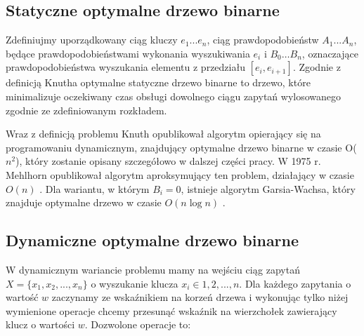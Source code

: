 \documentclass[declaration,shortabstract]{iithesis}
\theoremstyle{thm}
\theoremstyle{remark}
\theoremstyle{plain}
\theoremstyle{plain}
\theoremstyle{plain}
\begin{document}
\subsection{Statyczne optymalne drzewo binarne}   

Zdefiniujmy uporządkowany ciąg kluczy \(e_1...e_n\), ciąg prawdopodobieństw \(A_1...A_n\), będące prawdopodobieństwami wykonania wyszukiwania \(e_i\) i  \(B_0 … B_n\), oznaczające prawdopodobieństwa wyszukania elementu z przedziału \([e_i, e_{i+1}]\). Zgodnie z definicją Knutha \cite{knuth1971optimum} optymalne statyczne drzewo binarne to drzewo, które minimalizuje oczekiwany czas obsługi dowolnego ciągu zapytań wylosowanego zgodnie ze zdefiniowanym rozkładem.    

Wraz z definicją problemu Knuth opublikował algorytm opierający się na programowaniu dynamicznym, znajdujący optymalne drzewo binarne w czasie O(\(n^2\)), który zostanie opisany szczegółowo w dalszej części pracy. W 1975 r. Mehlhorn opublikował algorytm aproksymujący ten problem, działający w czasie \(O(n)\) \cite{mehlhorn1975nearly}. Dla wariantu, w którym \(B_i = 0\), istnieje algorytm Garsia-Wachsa, który znajduje optymalne drzewo w czasie \(O(n\log n)\) \cite{garsia1977new}.   

\subsection{Dynamiczne optymalne drzewo binarne}   

W dynamicznym wariancie problemu mamy na wejściu ciąg zapytań \(X  = \{x_1,x_2,..., x_n\}\) o wyszukanie klucza \(x_i \in {1, 2, ..., n}\). Dla każdego zapytania o wartość \(w\) zaczynamy ze wskaźnikiem na korzeń drzewa i wykonując tylko niżej wymienione operacje chcemy przesunąć wskaźnik na wierzchołek zawierający klucz o wartości \(w\). Dozwolone operacje to:   
\end{document}
